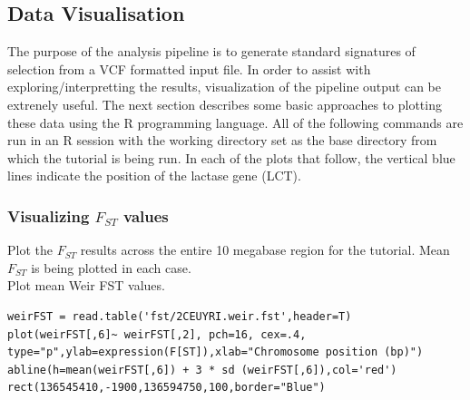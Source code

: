 \documentclass[a4paper,10pt]{article}
\begin{document}
\subsection{Data Visualisation}
The purpose of the analysis pipeline is to generate standard signatures of
selection from a VCF formatted input file. In order to assist with
exploring/interpretting the results, visualization of the pipeline
output can be extrenely useful.
The next section describes some basic approaches to 
plotting these data using the R programming language. All of the following
commands are run in an R session with the working directory set as the base
directory from which the tutorial is being run. In each of the plots
that follow, the vertical blue lines indicate the position of the
lactase gene (LCT).

\subsubsection{Visualizing $F_{ST}$ values}

\noindent
Plot the $F_{ST}$ results across the entire 10 megabase region for the tutorial.  Mean $F_{ST}$ is being plotted in each case.\\

\noindent
Plot mean Weir FST values.\\
\begin{verbatim}
weirFST = read.table('fst/2CEUYRI.weir.fst',header=T) 
plot(weirFST[,6]~ weirFST[,2], pch=16, cex=.4, 
type="p",ylab=expression(F[ST]),xlab="Chromosome position (bp)") 
abline(h=mean(weirFST[,6]) + 3 * sd (weirFST[,6]),col='red')
rect(136545410,-1900,136594750,100,border="Blue") 
\end{verbatim}
\end{document}
